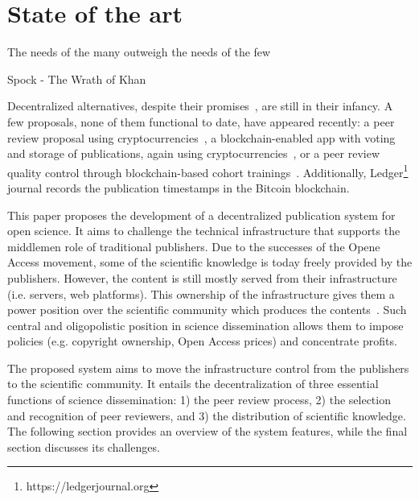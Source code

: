 \chapter{State of the art}

\begin{FraseCelebre}
  \begin{Frase}
    The needs of the many outweigh the needs of the few
  \end{Frase}
  \begin{Fuente}
    Spock - The Wrath of Khan
  \end{Fuente}
\end{FraseCelebre}


Decentralized alternatives, despite their promises~\cite{bartlingblockchain},
are still in their infancy. A few proposals, none of them functional to date,
have appeared recently: a peer review proposal using
cryptocurrencies~\cite{tennant2017multi}, a blockchain-enabled app with voting
and storage of publications, again using
cryptocurrencies~\cite{morton2017aletheia}, or a peer review quality control
through blockchain-based cohort trainings~\cite{dhillon2016bench}. Additionally,
Ledger\footnote{https://ledgerjournal.org} journal records the publication
timestamps in the Bitcoin blockchain.


This paper proposes the development of a decentralized publication system for
open science. It aims to challenge the technical infrastructure that supports
the middlemen role of traditional publishers. Due to the successes of the Opene
Access movement, some of the scientific knowledge is today freely provided by
the publishers. However, the content is still mostly served from their
infrastructure (i.e. servers, web platforms). This ownership of the
infrastructure gives them a power position over the scientific community which
produces the contents~\cite{fuster2010governance}. Such central and
oligopolistic position in science dissemination allows them to impose policies
(e.g. copyright ownership, Open Access prices) and concentrate profits.

The proposed system aims to move the infrastructure control from the publishers
to the scientific community. It entails the decentralization of three essential
functions of science dissemination: 1) the peer review process, 2) the selection
and recognition of peer reviewers, and 3) the distribution of scientific
knowledge. The following section provides an overview of the system features,
while the final section discusses its challenges.


